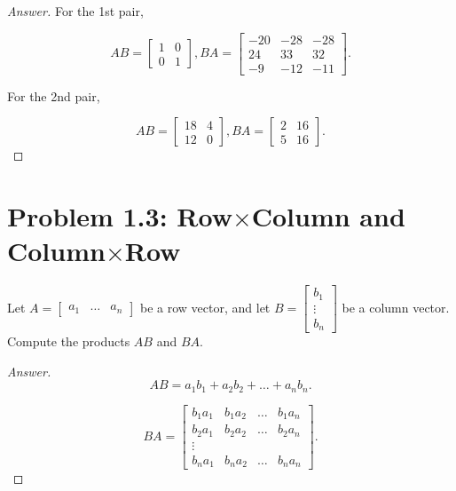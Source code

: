 \documentclass{amsbook}
\theoremstyle{definition}
\theoremstyle{remark}
\numberwithin{section}{chapter}
\numberwithin{equation}{chapter}
\begin{document}
\begin{proof}[Answer]

For the 1st pair,

\[AB=\begin{bmatrix}
1&0\\
0&1\end{bmatrix}, BA=\begin{bmatrix}
   -20  & -28  & -28\\
    24 &   33  &  32\\
    -9  & -12  & -11\end{bmatrix}.\]
    
For the 2nd pair,

\[AB=\begin{bmatrix}
    18   &  4\\
    12    &  0 \end{bmatrix}, BA=\begin{bmatrix}
     2   & 16 \\
     5   & 16 \end{bmatrix}. \]

\end{proof}

\section{Problem 1.3: Row$\times$Column and Column$\times$Row}

Let $A=\begin{bmatrix}
a_1 & \dots & a_n
\end{bmatrix}$ be a row vector, and let $B=\begin{bmatrix}
b_1\\
\vdots\\
b_n
\end{bmatrix}$ be a column vector. Compute the products $AB$ and $BA$.

\begin{proof}[Answer]

\[AB=a_1b_1+a_2b_2+\dots+a_nb_n.\]

\[BA=\begin{bmatrix}
b_1a_1 & b_1a_2 & \dots & b_1a_n \\
b_2a_1 & b_2a_2 & \dots & b_2a_n \\
\vdots \\
b_na_1 & b_na_2 & \dots & b_na_n
\end{bmatrix}. \]

\end{proof}
\end{document}

